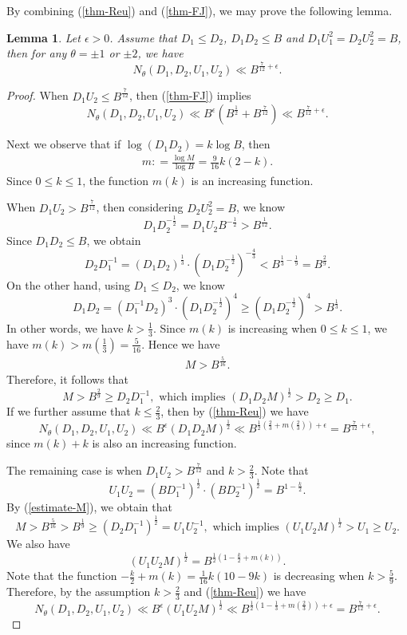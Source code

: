 \documentclass[reqno, 11pt, twoside]{amsart}
\numberwithin{equation}{section}
\newtheorem{lemma}[theorem]{Lemma}
\theoremstyle{definition}
\renewcommand{\leq}{\leqslant}
\renewcommand{\geq}{\geqslant}
\begin{document}
By combining (\ref{thm-Reu}) and (\ref{thm-FJ}), we may prove the following lemma.
\begin{lemma}\label{Reu+FJ}
	Let $\epsilon > 0$. Assume that $D_1 \leq D_2$, $D_1 D_2 \leq B$ and $D_1U_1^2 = D_2 U_2^2 = B$, then for any $\theta = \pm 1$ or $\pm 2$, we have
	$$N_\theta(D_1, D_2, U_1, U_2) \ll B^{\frac{7}{12} + \epsilon}.$$
\end{lemma}
\begin{proof}
	When $D_1 U_2 \leq B^{\frac{7}{12}}$, then (\ref{thm-FJ}) implies 
	$$N_\theta(D_1, D_2, U_1, U_2) \ll B^\epsilon (B^{\frac{1}{2}} + B^{\frac{7}{12}}) \ll B^{\frac{7}{12} + \epsilon}.$$
	
    Next we observe that if $\log (D_1D_2) = k \log B$, then 
    \begin{eqnarray}\label{log-M}
    	m: = \frac{\log M}{\log B} = \frac{9}{16} k (2 - k).
    \end{eqnarray}
    Since $0 \leq k \leq 1$, the function $m(k)$ is an increasing function. 
	
	When $D_1 U_2 > B^{\frac{7}{12}}$, then considering $D_2U_2^2 = B$, we know 
	$$D_1 D_2^{-\frac{1}{2}} = D_1U_2B^{-\frac{1}{2}} > B^{\frac{1}{12}}.$$ 
	Since $D_1D_2 \leq B$, we obtain
	$$D_2D_1^{-1} = (D_1D_2)^{\frac{1}{3}} \cdot (D_1D_2^{-\frac{1}{2}})^{-\frac{4}{3}} < B^{\frac{1}{3} - \frac{1}{9}} =    B^{\frac{2}{9}}.$$
	On the other hand, using $D_1 \leq D_2$, we know  $$D_1D_2 = (D_1^{-1}D_2)^3 \cdot (D_1D_2^{-\frac{1}{2}})^4 \geq (D_1 D_2^{-\frac{1}{2}})^4 > B^{\frac{1}{3}}.$$ 
	In other words, we have $k > \frac{1}{3}$. Since $m(k)$ is increasing when $0 \leq k \leq 1$, we have $m(k) > m(\frac{1}{3}) = \frac{5}{16}$. Hence we have
	\begin{eqnarray}\label{estimate-M}
		M > B^{\frac{5}{16}}.
	\end{eqnarray}
	Therefore, it follows that 
	$$M > B^{\frac{2}{9}} \geq D_2D_1^{-1}, \text{ which implies } (D_1D_2M)^{\frac{1}{2}} > D_2 \geq D_1.$$
	If we further assume that $k \leq \frac{2}{3}$, then by (\ref{thm-Reu}) we have
	$$N_\theta(D_1, D_2, U_1, U_2) \ll B^\epsilon (D_1D_2M)^{\frac{1}{2}} \ll B^{\frac{1}{2}(\frac{2}{3} + m(\frac{2}{3})) + \epsilon} = B^{\frac{7}{12} + \epsilon},$$
	since $m(k) + k$ is also an increasing function. 
	
The remaining case is when $D_1 U_2 > B^{\frac{7}{12}}$ and $k > \frac{2}{3}$. Note that $$U_1U_2 = (BD_1^{-1})^{\frac{1}{2}} \cdot (BD_2^{-1})^{\frac{1}{2}} = B^{1 - \frac{k}{2}}.$$ 
By (\ref{estimate-M}), we obtain that
$$M > B^{\frac{5}{16}} > B^{\frac{1}{9}} \geq (D_2D_1^{-1})^{\frac{1}{2}} = U_1U_2^{-1}, \text{ which implies }  (U_1U_2M)^{\frac{1}{2}} > U_1 \geq U_2.$$ 
We also have
$$(U_1U_2M)^{\frac{1}{2}} = B^{\frac{1}{2}(1  - \frac{k}{2} + m(k))}.$$
Note that the function 
$- \frac{k}{2} + m(k) = \frac{1}{16}k(10-9k)$
 is decreasing when $k > \frac{5}{9}$. Therefore, by the assumption $k > \frac{2}{3}$ and (\ref{thm-Reu}) we have
$$N_\theta(D_1, D_2, U_1, U_2) \ll B^\epsilon (U_1U_2M)^{\frac{1}{2}} \ll B^{\frac{1}{2}(1 - \frac{1}{3} + m(\frac{2}{3})) + \epsilon} = B^{\frac{7}{12} + \epsilon}.$$
	

\end{proof}
\end{document}
